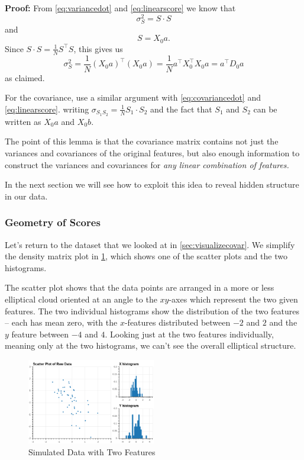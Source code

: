 \documentclass[
]{article}
\begin{document}
\textbf{Proof:} From \cref{eq:variancedot} and \ref{eq:linearscore} we
know that \[
\sigma_{S}^2 = S\cdot S
\] and \[
S = X_{0}a.
\] Since \(S\cdot S = \frac{1}{N}S^{\intercal}S\), this gives us \[
\sigma_{S}^2 = \frac{1}{N}(X_{0}a)^{\intercal}(X_{0}a) = \frac{1}{N}a^{\intercal}X_{0}^{\intercal}X_{0}a = a^{\intercal}D_{0}a
\] as claimed.

For the covariance, use a similar argument with \cref{eq:covariancedot}
and \cref{eq:linearscore}. writing
\(\sigma_{S_{1}S_{2}}=\frac{1}{N}S_{1}\cdot S_{2}\) and the fact that
\(S_{1}\) and \(S_{2}\) can be written as \(X_{0}a\) and \(X_{0}b\).

The point of this lemma is that the covariance matrix contains not just
the variances and covariances of the original features, but also enough
information to construct the variances and covariances for \emph{any
linear combination of features.}

In the next section we will see how to exploit this idea to reveal
hidden structure in our data.

\hypertarget{geometry-of-scores}{%
\subsubsection{Geometry of Scores}\label{geometry-of-scores}}

Let's return to the dataset that we looked at in
\cref{sec:visualizecovar}. We simplify the density matrix plot in
\cref{fig:pcasimfig}, which shows one of the scatter plots and the two
histograms.

The scatter plot shows that the data points are arranged in a more or
less elliptical cloud oriented at an angle to the \(xy\)-axes which
represent the two given features. The two individual histograms show the
distribution of the two features -- each has mean zero, with the
\(x\)-features distributed between \(-2\) and \(2\) and the \(y\)
feature between \(-4\) and \(4\). Looking just at the two features
individually, meaning only at the two histograms, we can't see the
overall elliptical structure.

\begin{figure}
\hypertarget{fig:pcasimfig}{%
\centering
\includegraphics[width=0.5\textwidth,height=\textheight]{../img/PCAsimulated-1.png}
\caption{Simulated Data with Two Features}\label{fig:pcasimfig}
}
\end{figure}
\end{document}
